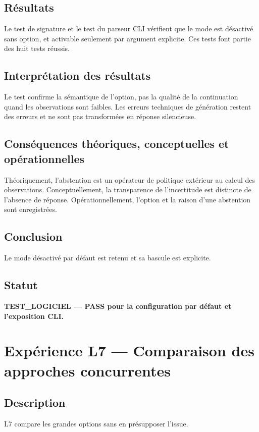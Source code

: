 \documentclass[11pt,a4paper]{report}
\begin{document}
\section{Résultats}
Le test de signature et le test du parseur CLI vérifient que le mode est désactivé sans option, et activable seulement par argument explicite. Ces tests font partie des huit tests réussis.
\section{Interprétation des résultats}
Le test confirme la sémantique de l'option, pas la qualité de la continuation quand les observations sont faibles. Les erreurs techniques de génération restent des erreurs et ne sont pas transformées en réponse silencieuse.
\section{Conséquences théoriques, conceptuelles et opérationnelles}
Théoriquement, l'abstention est un opérateur de politique extérieur au calcul des observations. Conceptuellement, la transparence de l'incertitude est distincte de l'absence de réponse. Opérationnellement, l'option et la raison d'une abstention sont enregistrées.
\section{Conclusion}
Le mode désactivé par défaut est retenu et sa bascule est explicite.
\section{Statut}
\textbf{TEST\_LOGICIEL — PASS pour la configuration par défaut et l'exposition CLI.}

\chapter{Expérience L7 — Comparaison des approches concurrentes}
\section{Description}
L7 compare les grandes options sans en présupposer l'issue.
\end{document}
